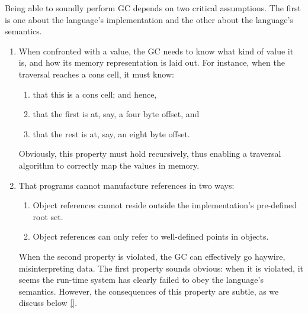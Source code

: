 
Being able to soundly perform GC depends on two critical assumptions. The first
is one about the language’s implementation and the other about the language’s
semantics.
\begin{enumerate}

  \item 
When confronted with a value, the GC needs to know what kind of value it is, and
how its memory representation is laid out. For instance, when the traversal
reaches a cons cell, it must know:
\begin{enumerate}
  \item   
that this is a cons cell; and hence,
  \item   
that the first is at, say, a four byte offset, and
  \item   
that the rest is at, say, an eight byte offset.
\end{enumerate}
Obviously, this property must hold recursively, thus enabling a traversal
algorithm to correctly map the values in memory.

  \item 
That programs cannot manufacture references in two ways:
\begin{enumerate}
  \item 
Object references cannot reside outside the implementation’s pre-defined root
set.
  \item 
Object references can only refer to well-defined points in objects.
\end{enumerate}
When the second property is violated, the GC can effectively go haywire,
misinterpreting data. The first property sounds obvious: when it is violated, it
seems the run-time system has clearly failed to obey the language’s semantics.
However, the consequences of this property are subtle, as we discuss below
\ref{}.
  
\end{enumerate}
